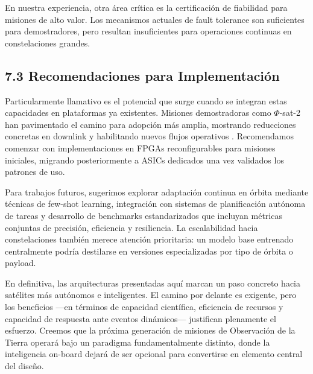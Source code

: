 En nuestra experiencia, otra área crítica es la certificación de fiabilidad para misiones de alto valor. Los mecanismos actuales de fault tolerance son suficientes para demostradores, pero resultan insuficientes para operaciones continuas en constelaciones grandes.

\subsection{7.3 Recomendaciones para Implementación}

Particularmente llamativo es el potencial que surge cuando se integran estas capacidades en plataformas ya existentes. Misiones demostradoras como $\Phi$-sat-2 han pavimentado el camino para adopción más amplia, mostrando reducciones concretas en downlink y habilitando nuevos flujos operativos \cite{PhiSat2_Overview}. Recomendamos comenzar con implementaciones en FPGAs reconfigurables para misiones iniciales, migrando posteriormente a ASICs dedicados una vez validados los patrones de uso.

Para trabajos futuros, sugerimos explorar adaptación continua en órbita mediante técnicas de few-shot learning, integración con sistemas de planificación autónoma de tareas y desarrollo de benchmarks estandarizados que incluyan métricas conjuntas de precisión, eficiencia y resiliencia. La escalabilidad hacia constelaciones también merece atención prioritaria: un modelo base entrenado centralmente podría destilarse en versiones especializadas por tipo de órbita o payload.

En definitiva, las arquitecturas presentadas aquí marcan un paso concreto hacia satélites más autónomos e inteligentes. El camino por delante es exigente, pero los beneficios —en términos de capacidad científica, eficiencia de recursos y capacidad de respuesta ante eventos dinámicos— justifican plenamente el esfuerzo. Creemos que la próxima generación de misiones de Observación de la Tierra operará bajo un paradigma fundamentalmente distinto, donde la inteligencia on-board dejará de ser opcional para convertirse en elemento central del diseño.